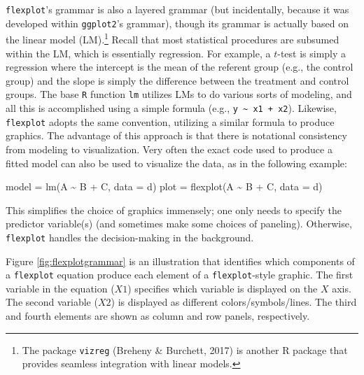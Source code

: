 \documentclass[
  english,
  man]{apa6}
\newenvironment{Shaded}{\begin{snugshade}}{\end{snugshade}}
\newcommand{\AttributeTok}[1]{\textcolor[rgb]{0.77,0.63,0.00}{#1}}
\newcommand{\FunctionTok}[1]{\textcolor[rgb]{0.00,0.00,0.00}{#1}}
\newcommand{\NormalTok}[1]{#1}
\newcommand{\OtherTok}[1]{\textcolor[rgb]{0.56,0.35,0.01}{#1}}
\newcommand{\SpecialCharTok}[1]{\textcolor[rgb]{0.00,0.00,0.00}{#1}}
\begin{document}
\texttt{flexplot}'s grammar is also a layered grammar (but incidentally, because it was developed within \texttt{ggplot2}'s grammar), though its grammar is actually based on the linear model (LM).\footnote{The package \texttt{vizreg} (Breheny \& Burchett, 2017) is another R package that provides seamless integration with linear models.} Recall that most statistical procedures are subsumed within the LM, which is essentially regression. For example, a \(t\)-test is simply a regression where the intercept is the mean of the referent group (e.g., the control group) and the slope is simply the difference between the treatment and control groups. The base \texttt{R} function \texttt{lm} utilizes LMs to do various sorts of modeling, and all this is accomplished using a simple formula (e.g., \texttt{y\ \textasciitilde{}\ x1\ +\ x2}). Likewise, \texttt{flexplot} adopts the same convention, utilizing a similar formula to produce graphics. The advantage of this approach is that there is notational consistency from modeling to visualization. Very often the exact code used to produce a fitted model can also be used to visualize the data, as in the following example:

\small

\begin{Shaded}
\begin{Highlighting}[]
\NormalTok{model }\OtherTok{=}       \FunctionTok{lm}\NormalTok{(A }\SpecialCharTok{\textasciitilde{}}\NormalTok{ B }\SpecialCharTok{+}\NormalTok{ C, }\AttributeTok{data =}\NormalTok{ d)}
\NormalTok{plot  }\OtherTok{=} \FunctionTok{flexplot}\NormalTok{(A }\SpecialCharTok{\textasciitilde{}}\NormalTok{ B }\SpecialCharTok{+}\NormalTok{ C, }\AttributeTok{data =}\NormalTok{ d)}
\end{Highlighting}
\end{Shaded}

\normalsize

This simplifies the choice of graphics immensely; one only needs to specify the predictor variable(s) (and sometimes make some choices of paneling). Otherwise, \texttt{flexplot} handles the decision-making in the background.

Figure \ref{fig:flexplotgrammar} is an illustration that identifies which components of a \texttt{flexplot} equation produce each element of a \texttt{flexplot}-style graphic. The first variable in the equation (\(X1\)) specifies which variable is displayed on the \(X\) axis. The second variable (\(X2\)) is displayed as different colors/symbols/lines. The third and fourth elements are shown as column and row panels, respectively.
\end{document}
